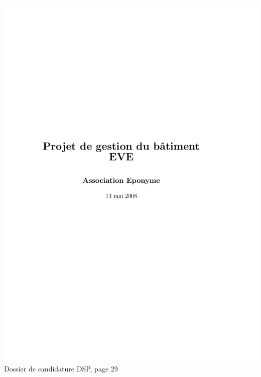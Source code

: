 \includegraphics[scale=0.85,trim=20mm 20mm 20mm 20mm,clip,page=29]{annexes/candidature_dsp.pdf} \\
Dossier de candidature DSP, page 29
\newpage
